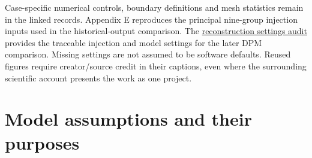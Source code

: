 Case-specific numerical controls, boundary definitions and mesh statistics remain in the linked records. Appendix E reproduces the principal nine-group injection inputs used in the historical-output comparison. The \href{https://github.com/Shuhei-uni/P4P_knowledgeWiki/blob/main/Project/experiments/phase-10-single-inlet-mesh-convergence/replication1600-settings-audit.md}{reconstruction settings audit} provides the traceable injection and model settings for the later DPM comparison. Missing settings are not assumed to be software defaults. Reused figures require creator/source credit in their captions, even where the surrounding scientific account presents the work as one project.

\section{Model assumptions and their purposes}

